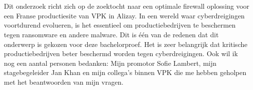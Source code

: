 
\chapter*{}%
\label{ch:voorwoord}

Dit onderzoek richt zich op de zoektocht naar een optimale firewall oplossing voor een Franse productiesite van VPK in Alizay. In een wereld waar cyberdreigingen voortdurend evolueren, is het essentieel om productiebedrijven te beschermen tegen ransomware en andere malware. Dit is één van de redenen dat dit onderwerp is gekozen voor deze bachelorproef. Het is zeer belangrijk dat kritische productiebedrijven beter beschermd worden tegen cyberdreigingen.
Ook wil ik nog een aantal personen bedanken: Mijn promotor Sofie Lambert, mijn stagebegeleider Jan Khan en mijn collega's binnen VPK die me hebben geholpen met het beantwoorden van mijn vragen.